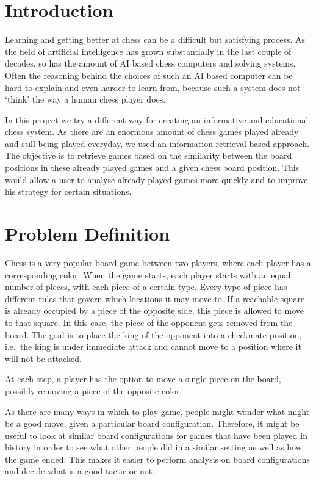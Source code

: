 \documentclass[11pt]{article}
\begin{document}
    \section{Introduction}

    Learning and getting better at chess can be a difficult but satisfying process. As the field of artificial intelligence has grown substantially in the last couple of decades, so has the amount of AI based chess computers and solving systems. Often the reasoning behind the choices of such an AI based computer can be hard to explain and even harder to learn from, because such a system does not `think' the way a human chess player does.

    In this project we try a different way for creating an informative and educational chess system. As there are an enormous amount of chess games played already and still being played everyday, we used an information retrieval based approach. The objective is to retrieve games based on the similarity between the board positions in these already played games and a given chess board position. This would allow a user to analyse already played games more quickly and to improve his strategy for certain situations.
    \section{Problem Definition}

    Chess is a very popular board game between two players, where each player has a corresponding color. When the game starts, each player starts with an equal number of pieces, with each piece of a certain type. Every type of piece has different rules that govern which locations it may move to. If a reachable square is already occupied by a piece of the opposite side, this piece is allowed to move to that square. In this case, the piece of the opponent gets removed from the board. The goal is to place the king of the opponent into a checkmate position, i.e.\ the king is under immediate attack and cannot move to a position where it will not be attacked.

    At each step, a player has the option to move a single piece on the board, possibly removing a piece of the opposite color.

    As there are many ways in which to play game, people might wonder what might be a good move, given a particular board configuration. Therefore, it might be useful to look at similar board configurations for games that have been played in history in order to see what other people did in a similar setting as well as how the game ended. This makes it easier to perform analysis on board configurations and decide what is a good tactic or not.
\end{document}

